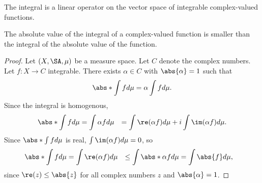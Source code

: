 \begin{prop}
The integral is a linear
operator on the vector space
of integrable complex-valued
functions.
\end{prop}

\begin{prop}
The absolute value
of the integral of a
complex-valued function
is smaller than the integral
of the absolute value
of the function.

\begin{proof}
Let $(X, \SA, \mu)$
be a measure space.
Let $C$ denote the
complex numbers.
Let $f: X \to C$
integrable.
There exists $\alpha \in C$
with $\abs{\alpha} = 1$
such that
\[
  \abs*{\int f d\mu} = \alpha \int f d\mu.
\]
Since the integral is homogenous,
\[
  \begin{aligned}
  \abs*{\int f d\mu}
  &= \int \alpha f d\mu
  &= \int \re(\alpha f) d\mu + i \int \im(\alpha f)d\mu.
  \end{aligned}
\]
  Since $\abs*{\int f d\mu}$ is real,
  $\int \im(\alpha f) d\mu = 0$,
  so
  \[
  \begin{aligned}
  \abs*{\int f d\mu}
  &= \int \re(\alpha f) d\mu
  &\leq \int \abs*{\alpha f} d\mu
  &= \int \abs{f} d\mu,
  \end{aligned}
  \]
  since $\re(z) \leq \abs{z}$ for all
  complex numbers $z$ and $\abs{\alpha} = 1$.
\end{proof}
\end{prop}
\strats
